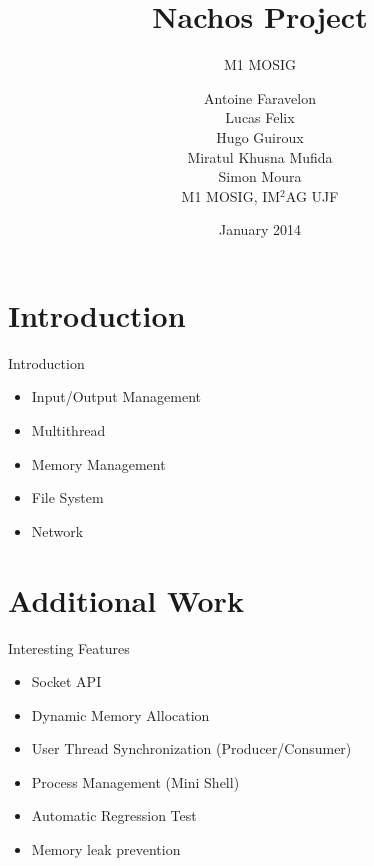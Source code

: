 \documentclass{beamer}
\begin{document}
\title{Nachos Project}
\subtitle{M1 MOSIG}   
\author{Antoine Faravelon
\\
Lucas Felix
\\
Hugo Guiroux
\\
Miratul Khusna Mufida
\\
Simon Moura
\\
M1 MOSIG, IM$^2$AG UJF 
}
\date{January 2014} 


\frame{\titlepage} 

\section{Introduction}
\begin{frame}{Introduction}
  \begin{itemize}
    \item Input/Output Management
    \item Multithread
    \item Memory Management
    \item File System
    \item Network
  \end{itemize}
\end{frame}
\section{Additional Work}
\begin{frame}{Interesting Features}
  \begin{itemize}
	\item Socket API 
	\item Dynamic Memory Allocation
	\item User Thread Synchronization (Producer/Consumer)
    \item Process Management (Mini Shell)
    \item Automatic Regression Test 
    \item Memory leak prevention
  \end{itemize}
\end{frame}
\end{document}

